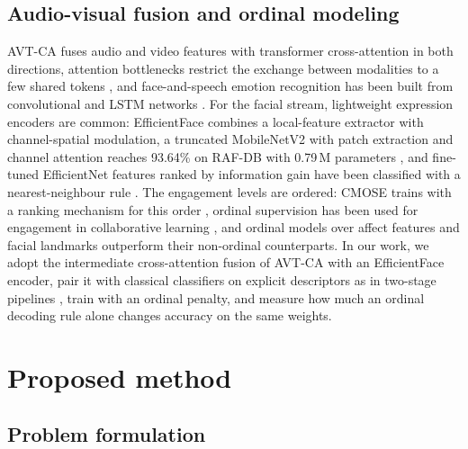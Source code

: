 \documentclass[pdflatex,iicol,sn-basic]{sn-jnl}
\begin{document}
\subsection{Audio-visual fusion and ordinal modeling}\label{sec:rw_av}

AVT-CA \citep{venkatraman2025avtca} fuses audio and video features with transformer cross-attention in both directions, attention bottlenecks restrict the exchange between modalities to a few shared tokens \citep{nagrani2021attention}, and face-and-speech emotion recognition has been built from convolutional and LSTM networks \citep{taware2025mer}. For the facial stream, lightweight expression encoders are common: EfficientFace \citep{zhao2021efficientface} combines a local-feature extractor with channel-spatial modulation, a truncated MobileNetV2 with patch extraction and channel attention reaches 93.64\% on RAF-DB with 0.79\,M parameters \citep{vu2026lightweightfer}, and fine-tuned EfficientNet features ranked by information gain have been classified with a nearest-neighbour rule \citep{tribedi2025featureselection}. The engagement levels are ordered: CMOSE trains with a ranking mechanism for this order \citep{wu2024cmose}, ordinal supervision has been used for engagement in collaborative learning \citep{tran2026ordinal}, and ordinal models over affect features \citep{abedi2024affect} and facial landmarks \citep{abedi2024stgcn} outperform their non-ordinal counterparts. In our work, we adopt the intermediate cross-attention fusion of AVT-CA with an EfficientFace encoder, pair it with classical classifiers on explicit descriptors as in two-stage pipelines \citep{tribedi2025featureselection}, train with an ordinal penalty, and measure how much an ordinal decoding rule alone changes accuracy on the same weights.

\section{Proposed method}\label{sec:method}

\subsection{Problem formulation}\label{sec:formulation}
\end{document}
